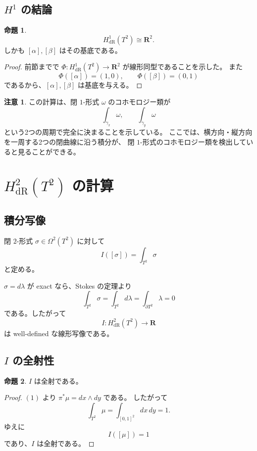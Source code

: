 \documentclass[uplatex,dvipdfmx,11pt]{jsarticle}
\newcommand{\R}{\mathbf{R}}
\theoremstyle{definition}
\newtheorem{prop}{命題}
\newtheorem{remark}{注意}
\begin{document}
\subsection{\(H^1\) の結論}

\begin{prop}
\[
H^1_{\mathrm{dR}}(T^2)\cong \R^2.
\]
しかも \([\alpha],[\beta]\) はその基底である。
\end{prop}

\begin{proof}
前節までで \(\Phi:H^1_{\mathrm{dR}}(T^2)\to\R^2\) が線形同型であることを示した。
また
\[
\Phi([\alpha])=(1,0),\qquad \Phi([\beta])=(0,1)
\]
であるから、\([\alpha],[\beta]\) は基底を与える。
\end{proof}

\begin{remark}
この計算は、閉 $1$-形式 \(\omega\) のコホモロジー類が
\[
\int_{\gamma_x}\omega,\qquad \int_{\gamma_y}\omega
\]
という2つの周期で完全に決まることを示している。
ここでは、横方向・縦方向を一周する2つの閉曲線に沿う積分が、
閉 \(1\)-形式のコホモロジー類を検出していると見ることができる。
\end{remark}

\section{\(H^2_{\mathrm{dR}}(T^2)\) の計算}

\subsection{積分写像}

閉 $2$-形式 \(\sigma\in \Omega^2(T^2)\) に対して
\[
I([\sigma])=\int_{T^2}\sigma
\]
と定める。

\(\sigma=d\lambda\) が exact なら、Stokes の定理より
\[
\int_{T^2}\sigma=\int_{T^2}d\lambda=\int_{\partial T^2}\lambda=0
\]
である。したがって
\[
I:H^2_{\mathrm{dR}}(T^2)\to \R
\]
は well-defined な線形写像である。

\subsection{\(I\) の全射性}

\begin{prop}
\(I\) は全射である。
\end{prop}

\begin{proof}
\((1)\) より \(\pi^*\mu=dx\wedge dy\) である。
したがって
\[
\int_{T^2}\mu=\int_{[0,1]^2} dx\,dy=1.
\]
ゆえに
\[
I([\mu])=1
\]
であり、\(I\) は全射である。
\end{proof}
\end{document}
